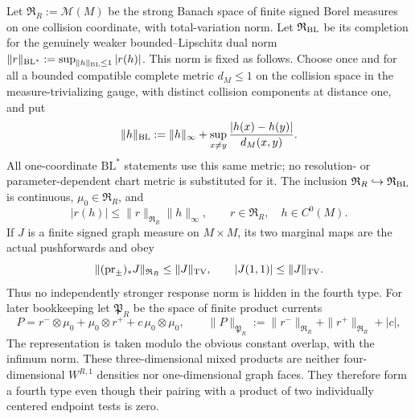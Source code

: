 \documentclass[11pt]{article}
\begin{document}
Let $\mathfrak R_R:=\mathcal M(M)$ be the strong Banach space of finite
signed Borel measures on one collision coordinate, with total-variation
norm.  Let $\mathfrak R_{\rm BL}$ be its completion for the genuinely weaker
bounded--Lipschitz dual norm
$\|r\|_{\rm BL^*}:=\sup_{\|h\|_{\rm BL}\le1}|r(h)|$.  This norm is fixed as
follows.  Choose once and for all a bounded compatible complete metric
$d_M\le1$ on the collision space in the measure-trivializing gauge, with
distinct collision components at distance one, and put
\begin{equation}
\label{eq:fixed-collision-BL-metric}
 \|h\|_{\rm BL}:=\|h\|_\infty+
 \sup_{x\ne y}\frac{|h(x)-h(y)|}{d_M(x,y)}.
\end{equation}
All one-coordinate $\mathrm{BL}^*$ statements use this same metric; no
resolution- or parameter-dependent chart metric is substituted for it.
The inclusion $\mathfrak R_R\hookrightarrow\mathfrak R_{\rm BL}$ is
continuous, $\mu_0\in\mathfrak R_R$, and
\begin{equation}
\label{eq:one-coordinate-response-pairing}
 |r(h)|\le\|r\|_{\mathfrak R_R}\|h\|_\infty,
 \qquad r\in\mathfrak R_R,\quad h\in C^0(M).
\end{equation}
If $J$ is a finite signed graph measure on $M\times M$, its two marginal
maps are the actual pushforwards and obey
\begin{equation}
\label{eq:bounded-face-marginal-maps}
 \|({\rm pr}_\pm)_*J\|_{\mathfrak R_R}
 \le\|J\|_{\rm TV},\qquad |J(1,1)|\le\|J\|_{\rm TV}.
\end{equation}
Thus no independently stronger response norm is hidden in the fourth type.
For later bookkeeping let $\mathfrak P_R$ be the space of finite product
currents
\begin{equation}
\label{eq:product-current-type}
 P=r^-\otimes\mu_0+\mu_0\otimes r^++c\,\mu_0\otimes\mu_0,\qquad
 \|P\|_{\mathfrak P_R}:=\|r^-\|_{\mathfrak R_R}
 +\|r^+\|_{\mathfrak R_R}+|c|,
\end{equation}
The representation is taken modulo the obvious
constant overlap, with the infimum norm.  These three-dimensional mixed
products are neither four-dimensional $W^{R,1}$ densities nor
one-dimensional graph faces.  They therefore form a fourth type even though
their pairing with a product of two individually centered endpoint tests is
zero.
\end{document}
